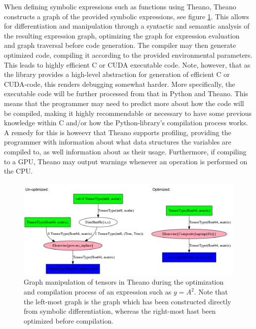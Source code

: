 When defining symbolic expressions such as functions using Theano, Theano constructs a graph of the provided symbolic expressions, see figure \ref{fig:theano_graph_demo}. This allows for differentiation and manipulation through a syntactic and semantic analysis of the resulting expression graph, optimizing the graph for expression evaluation and graph traversal before code generation. The compiler may then generate optimized code, compiling it according to the provided environmental parameters. This leads to highly efficient C or CUDA executable code.
Note, however, that as the library provides a high-level abstraction for generation of efficient C or CUDA-code, this renders debugging somewhat harder. More specifically, the executable code will be further processed from that in Python and Theano. This means that the programmer may need to predict more about how the code will be compiled, making it highly recommendable or necessary to have some previous knowledge within C and/or how the Python-library's compilation process works. A remedy for this is howeevr that Theano supports profiling, providing the programmer with information about what data structures the variables are compiled to, as well information about as their usage. Furthermore, if compiling to a GPU, Theano may output warnings whenever an operation is performed on the CPU.

\begin{figure}
\centering
\includegraphics[width=12cm]{fig/unopt_opt_theano_graph}
\caption{Graph manipulation of tensors in Theano during the optimization and compilation process of an expression such as $y = A^2$. Note that the left-most graph is the graph which has been constructed directly from symbolic differentiation, whereas the right-most hast been optimized before compilation.}
\label{fig:theano_graph_demo}
\end{figure}

